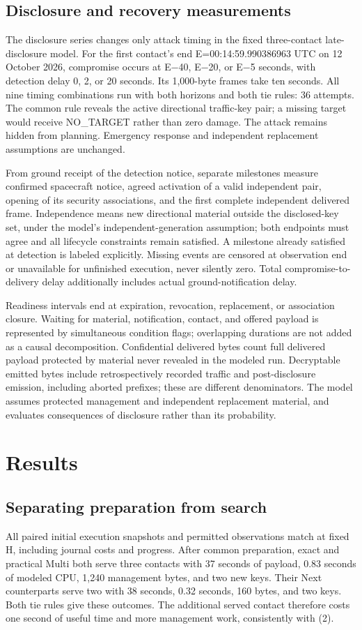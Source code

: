 \documentclass[12pt,a4paper]{article}
\begin{document}
\subsection*{Disclosure and recovery measurements}
The disclosure series changes only attack timing in the fixed three-contact late-disclosure model. For the first contact's end E=00:14:59.990386963 UTC on 12 October 2026, compromise occurs at E$-$40, E$-$20, or E$-$5 seconds, with detection delay 0, 2, or 20 seconds. Its 1,000-byte frames take ten seconds. All nine timing combinations run with both horizons and both tie rules: 36 attempts. The common rule reveals the active directional traffic-key pair; a missing target would receive NO\_TARGET rather than zero damage. The attack remains hidden from planning. Emergency response and independent replacement assumptions are unchanged.

From ground receipt of the detection notice, separate milestones measure confirmed spacecraft notice, agreed activation of a valid independent pair, opening of its security associations, and the first complete independent delivered frame. Independence means new directional material outside the disclosed-key set, under the model's independent-generation assumption; both endpoints must agree and all lifecycle constraints remain satisfied. A milestone already satisfied at detection is labeled explicitly. Missing events are censored at observation end or unavailable for unfinished execution, never silently zero. Total compromise-to-delivery delay additionally includes actual ground-notification delay.

Readiness intervals end at expiration, revocation, replacement, or association closure. Waiting for material, notification, contact, and offered payload is represented by simultaneous condition flags; overlapping durations are not added as a causal decomposition. Confidential delivered bytes count full delivered payload protected by material never revealed in the modeled run. Decryptable emitted bytes include retrospectively recorded traffic and post-disclosure emission, including aborted prefixes; these are different denominators. The model assumes protected management and independent replacement material, and evaluates consequences of disclosure rather than its probability.

\section*{Results}
\subsection*{Separating preparation from search}
All paired initial execution snapshots and permitted observations match at fixed H, including journal costs and progress. After common preparation, exact and practical Multi both serve three contacts with 37 seconds of payload, 0.83 seconds of modeled CPU, 1,240 management bytes, and two new keys. Their Next counterparts serve two with 38 seconds, 0.32 seconds, 160 bytes, and two keys. Both tie rules give these outcomes. The additional served contact therefore costs one second of useful time and more management work, consistently with (2).
\end{document}
